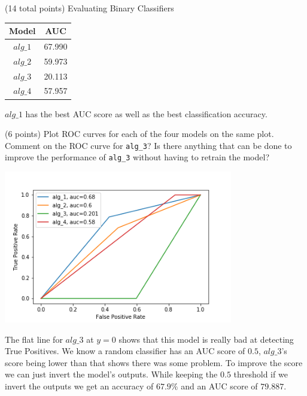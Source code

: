 \documentclass[12pt]{article}
\begin{document}
\begin{question}{(14 total points) Evaluating Binary Classifiers}
\begin{subquestion}
\begin{answerbox}{15em}
\begin{center}
    \begin{tabular}{|c|c|}
    \hline
    Model & AUC \\ \hline
    $alg\_1$ & 67.990 \\
    $alg\_2$ & 59.973 \\
    $alg\_3$ & 20.113 \\
    $alg\_4$ & 57.957 \\
    \hline
    \end{tabular}
\end{center}
$alg\_1$ has the best AUC score as well as the best classification accuracy.
\end{answerbox}



\end{subquestion}



%
%
\begin{subquestion}{(6 points) Plot ROC curves for each of the four models on the same plot.
Comment on the ROC curve for \texttt{alg\_3}?
Is there anything that can be done to improve the performance of \texttt{alg\_3} without having to retrain the model?\\
}


\begin{answerbox}{35em}
\begin{center}
    \includegraphics[width=0.75\textwidth]{results/roc-curves.png}
\end{center}    
The flat line for $alg\_3$ at $y=0$ shows that this model is really bad at detecting True Positives. We know a random classifier has an AUC score of $0.5$, $alg\_3$'s score being lower than that shows there was some problem. To improve  the score we can just invert the model's outputs. While keeping the $0.5$ threshold if we invert the outputs we get an accuracy of $67.9\%$ and an AUC score of $79.887$.
\end{answerbox}



\end{subquestion}

\end{question}
\end{document}

